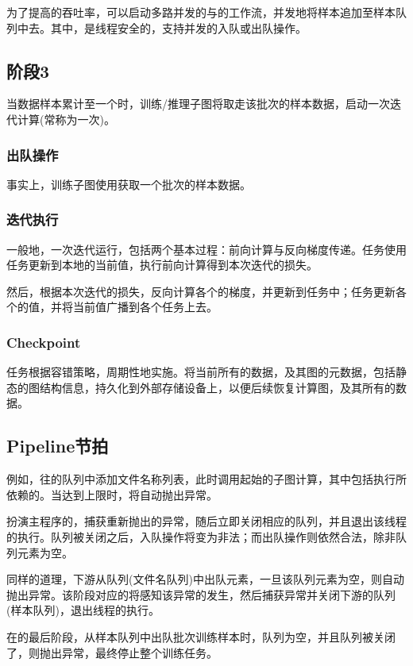 \begin{content}
为了提高的吞吐率，可以启动多路并发的与的工作流，并发地将样本追加至样本队列中去。其中，是线程安全的，支持并发的入队或出队操作。

\subsection{阶段3}

当数据样本累计至一个时，训练/推理子图将取走该批次的样本数据，启动一次迭代计算(常称为一次)。

\subsubsection{出队操作}

事实上，训练子图使用获取一个批次的样本数据。

\subsubsection{迭代执行}

一般地，一次迭代运行，包括两个基本过程：前向计算与反向梯度传递。任务使用任务更新到本地的当前值，执行前向计算得到本次迭代的损失。

然后，根据本次迭代的损失，反向计算各个的梯度，并更新到任务中；任务更新各个的值，并将当前值广播到各个任务上去。

\subsubsection{Checkpoint}

任务根据容错策略，周期性地实施。将当前所有的数据，及其图的元数据，包括静态的图结构信息，持久化到外部存储设备上，以便后续恢复计算图，及其所有的数据。

\subsection{Pipeline节拍}

例如，往的队列中添加文件名称列表，此时调用起始的子图计算，其中包括执行所依赖的。当达到上限时，将自动抛出异常。

扮演主程序的，捕获重新抛出的异常，随后立即关闭相应的队列，并且退出该线程的执行。队列被关闭之后，入队操作将变为非法；而出队操作则依然合法，除非队列元素为空。

同样的道理，下游从队列(文件名队列)中出队元素，一旦该队列元素为空，则自动抛出异常。该阶段对应的将感知该异常的发生，然后捕获异常并关闭下游的队列(样本队列)，退出线程的执行。

在的最后阶段，从样本队列中出队批次训练样本时，队列为空，并且队列被关闭了，则抛出异常，最终停止整个训练任务。
\end{content}